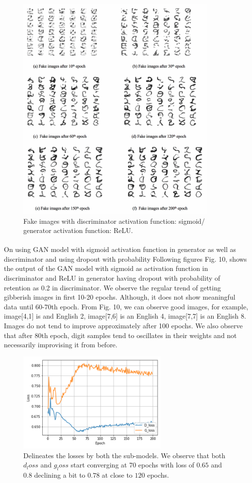 \documentclass{article}
\begin{document}
\begin{figure}[H]
	\centering
	\includegraphics[width=10cm]{figs/Picture10}
	\caption{Fake images with discriminator activation function: sigmoid/ generator activation function: ReLU.}
\end{figure}

\paragraph{}
On using GAN model with sigmoid activation function in generator as well as discriminator and using dropout with probability Following figures Fig. 10, shows the output of the GAN model with sigmoid as activation function in discriminator and ReLU in generator having dropout with probability of retention as 0.2 in discriminator. We observe the regular trend of getting gibberish images in first 10-20 epochs. Although, it does not show meaningful data until 60-70th epoch. From Fig. 10, we can observe good images, for example, image[4,1] is and English 2, image[7,6] is an English 4, image[7,7] is an English 8. Images do not tend to improve approximately after 100 epochs. We also observe that after 80th epoch, digit samples tend to oscillates in their weights and not necessarily improvising it from before.


\begin{figure}[H]
	\centering
	\includegraphics[width=7.5cm]{figs/Picture11}
	\caption{Delineates the losses by both the sub-models. We observe that both $d_loss$ and $g_loss$ start converging at 70 epochs with loss of $0.65$ and $0.8$ declining a bit to $0.78$ at close to $120$ epochs.}
\end{figure}
\end{document}
